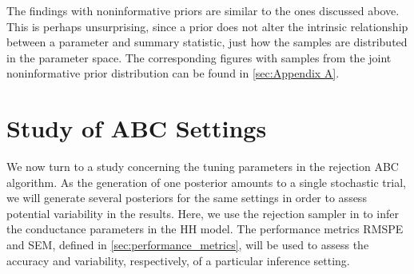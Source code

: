 The findings with noninformative priors are similar to the ones discussed above. This is perhaps unsurprising, since a prior does not alter the intrinsic relationship between a parameter and summary statistic, just how the samples are distributed in the parameter space. The corresponding figures with samples from the joint noninformative prior distribution can be found in \cref{sec:Appendix A}.


\section{Study of ABC Settings}

We now turn to a study concerning the tuning parameters in the rejection ABC algorithm. As the generation of one posterior amounts to a single stochastic trial, we will generate several posteriors for the same settings in order to assess potential variability in the results. Here, we use the rejection sampler in  to infer the conductance parameters in the HH model. The performance metrics RMSPE and SEM, defined in \cref{sec:performance_metrics}, will be used to assess the accuracy and variability, respectively, of a particular inference setting.

